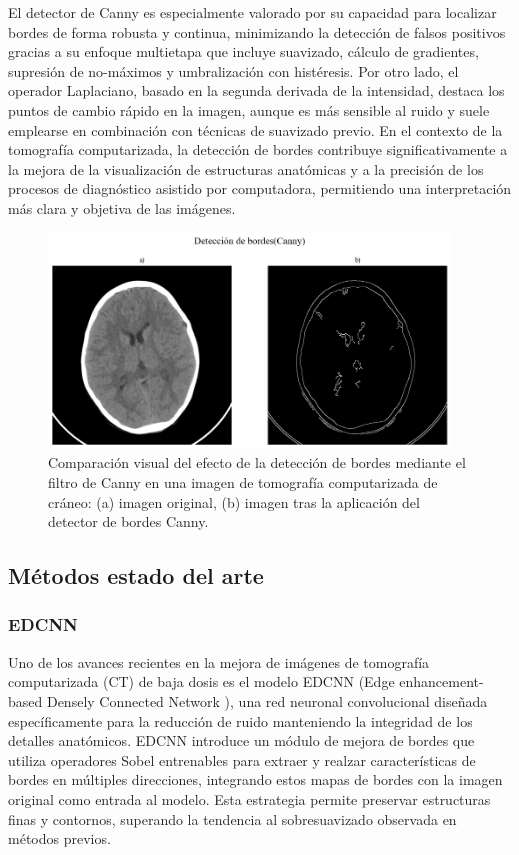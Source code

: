 El detector de Canny es especialmente valorado por su capacidad para localizar bordes de forma robusta y continua, minimizando la detección de falsos positivos gracias a su enfoque multietapa que incluye suavizado, cálculo de gradientes, supresión de no-máximos y umbralización con histéresis. Por otro lado, el operador Laplaciano, basado en la segunda derivada de la intensidad, destaca los puntos de cambio rápido en la imagen, aunque es más sensible al ruido y suele emplearse en combinación con técnicas de suavizado previo. En el contexto de la tomografía computarizada, la detección de bordes contribuye significativamente a la mejora de la visualización de estructuras anatómicas y a la precisión de los procesos de diagnóstico asistido por computadora, permitiendo una interpretación más clara y objetiva de las imágenes.

\begin{figure}[H]
    \centering
    \includegraphics[width=0.95\textwidth]{Graphics/canny.png}
    \caption{Comparación visual del efecto de la detección de bordes mediante el filtro de Canny en una imagen de tomografía computarizada de cráneo: (a) imagen original, (b) imagen tras la aplicación del detector de bordes Canny.}
    \label{fig:filter-canny}
\end{figure}

\subsection{Métodos estado del arte}

\subsubsection{EDCNN}

Uno de los avances recientes en la mejora de imágenes de tomografía computarizada (CT) de baja dosis es el modelo EDCNN (Edge enhancement-based Densely Connected Network \cite{EDCNN}), una red neuronal convolucional diseñada específicamente para la reducción de ruido manteniendo la integridad de los detalles anatómicos. EDCNN introduce un módulo de mejora de bordes que utiliza operadores Sobel entrenables para extraer y realzar características de bordes en múltiples direcciones, integrando estos mapas de bordes con la imagen original como entrada al modelo. Esta estrategia permite preservar estructuras finas y contornos, superando la tendencia al sobresuavizado observada en métodos previos.

